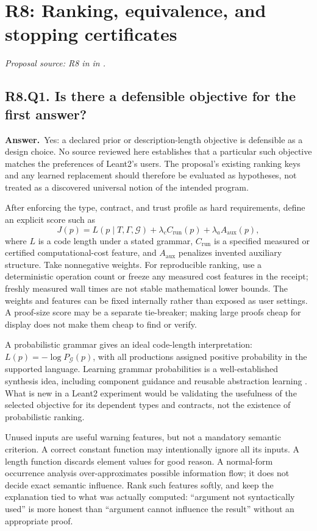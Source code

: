 \documentclass[11pt,a4paper]{article}
\theoremstyle{definition}
\theoremstyle{remark}
\newcommand{\answer}{\par\noindent\textbf{Answer.}\ }
\newcommand{\sourcepart}[1]{\par\noindent\textit{Proposal source: #1 in \cite{proposal}.}}
\newcommand{\qheading}[2]{\subsection{#1. #2}}
\begin{document}
\section{R8: Ranking, equivalence, and stopping certificates}
\label{sec:r8}
\sourcepart{R8 in }

\qheading{R8.Q1}{Is there a defensible objective for the first answer?}
\answer Yes: a declared prior or description-length objective is defensible as
a design choice. No source reviewed here establishes that a particular such
objective matches the preferences of Leant2's users. The proposal's existing
ranking keys and any learned replacement should therefore be evaluated as
hypotheses, not treated as a discovered universal notion of the intended program.

After enforcing the type, contract, and trust profile as hard requirements,
define an explicit score such as
\[
 J(p)=L(p\mid T,\Gamma,\mathcal G)
       +\lambda_c C_{\mathrm{run}}(p)
       +\lambda_a A_{\mathrm{aux}}(p),
 \tag{18}\label{eq:rank}
\]
where $L$ is a code length under a stated grammar, $C_{\mathrm{run}}$ is a
specified measured or certified computational-cost feature, and
$A_{\mathrm{aux}}$ penalizes invented auxiliary structure. Take nonnegative weights. For reproducible ranking, use a deterministic
operation count or freeze any measured cost features in the receipt; freshly
measured wall times are not stable mathematical lower bounds. The weights and
features can be fixed internally rather than exposed as user settings.
A proof-size score may be a separate tie-breaker; making large proofs cheap for
display does not make them cheap to find or verify.

A probabilistic grammar gives an ideal code-length interpretation:
$L(p)=-\log P_{\mathcal G}(p)$, with all productions assigned positive
probability in the supported language. Learning grammar probabilities is a
well-established synthesis idea, including component guidance and reusable
abstraction learning \cite{deepcoder,dreamcoder}. What is new in a Leant2
experiment would be validating the usefulness of the selected objective for
its dependent types and contracts, not the existence of probabilistic ranking.

Unused inputs are useful warning features, but not a mandatory semantic
criterion. A correct constant function may intentionally ignore all its inputs.
A length function discards element values for good reason. A normal-form
occurrence analysis over-approximates possible information flow; it does not
decide exact semantic influence. Rank such features softly, and keep the
explanation tied to what was actually computed: ``argument not syntactically
used'' is more honest than ``argument cannot influence the result'' without
an appropriate proof.
\end{document}

